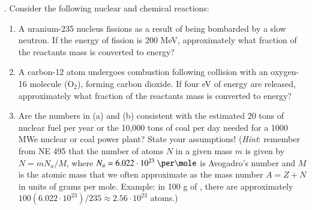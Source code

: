 .
Consider the following nuclear and chemical reactions:
\begin{enumerate}[label=(\alph*)]
\item A uranium-235 nucleus fissions as a result of being bombarded by a slow neutron.
If the energy of fission is 200 MeV, approximately what fraction of the reactants
mass is converted to energy?
\item A carbon-12 atom undergoes combustion following collision with an oxygen-16
molecule (O$_2$), forming carbon dioxide. If four eV of energy are released,
approximately what fraction of the reactants mass is converted to energy?
\item Are the numbers in (a) and (b) consistent with the estimated 20 tons of nuclear fuel per year or the 10,000 tons of coal per day needed for a 1000 MWe nuclear or coal power plant? State your assumptions!  ({\it Hint}: remember from NE 495 that the number of atoms $N$ in a given mass $m$ is given by $N=m N_a / M$, where $N_a = 6.022\cdot 10^{23}~\per\mole$ is Avogadro's number and $M$ is the atomic mass that we often approximate as the mass number $A = Z+N$ in units of grams per mole.  Example: in 100 g of , there are approximately $100(6.022\cdot 10^{23})/235 \approx 2.56\cdot 10^{23}$ atoms.)
\end{enumerate}



